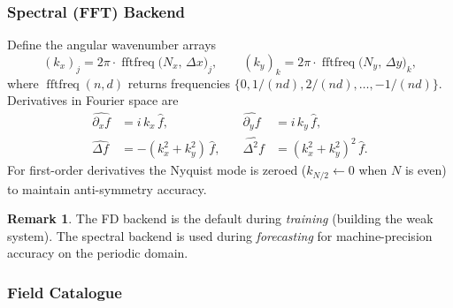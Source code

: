 \documentclass[11pt, letterpaper]{article}
\theoremstyle{definition}
\newtheorem{remark}{Remark}[section]
\newcommand{\lap}{\Delta}
\newcommand{\bilap}{\Delta^{2}}
\DeclareMathOperator{\fftfreq}{fftfreq}
\begin{document}
\subsubsection{Spectral (FFT) Backend}
\label{sec:spectral-derivs}

Define the angular wavenumber arrays
\begin{equation}
\label{eq:wavenumbers}
  (k_x)_j = 2\pi \cdot \fftfreq\!\bigl(N_x,\, \Delta x\bigr)_j, \qquad
  (k_y)_k = 2\pi \cdot \fftfreq\!\bigl(N_y,\, \Delta y\bigr)_k,
\end{equation}
where $\fftfreq(n, d)$ returns frequencies $\{0, 1/(nd), 2/(nd),
\dots, -1/(nd)\}$.  Derivatives in Fourier space are
\begin{align}
  \widehat{\partial_x f} &= i\, k_x \,\hat{f},
  &\quad
  \widehat{\partial_y f} &= i\, k_y \,\hat{f},
  \label{eq:spec-first} \\[4pt]
  \widehat{\lap f} &= -(k_x^{2} + k_y^{2})\,\hat{f},
  &\quad
  \widehat{\bilap f} &= (k_x^{2} + k_y^{2})^{2}\,\hat{f}.
  \label{eq:spec-second}
\end{align}
For first-order derivatives the Nyquist mode is zeroed
($k_{N/2} \leftarrow 0$ when $N$ is even) to maintain anti-symmetry
accuracy.

\begin{remark}
The FD backend is the default during \emph{training} (building the
weak system).  The spectral backend is used during \emph{forecasting}
for machine-precision accuracy on the periodic domain.
\end{remark}

\subsubsection{Field Catalogue}
\label{sec:field-catalogue}
\end{document}
